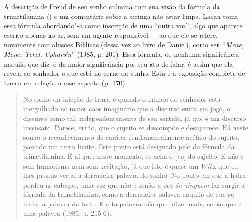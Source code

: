 A descrição de Freud de seu sonho culmina com sua visão da fórmula da
trimetilamina () e um comentário sobre a seringa não estar
limpa. Lacan toma essa fórmula abordando"-a como inscrição de uma ``outra
voz'', algo que aparece escrito apenas no ar, sem um agente responsável
--- ao que ele se refere, novamente com alusões Bíblicas (dessa vez ao
livro de Daniel), como seu ``\emph{Mene, Mene, Tekel, Upharsin}'' (1985, p.
201). Essa fórmula, de nenhuma significância naquilo que diz, é da maior
significância por seu ato de falar; é assim que ela revela ao sonhador o
que está no cerne do sonho. Esta é a exposição completa de Lacan em
relação a esse aspecto (p. 170):

\begin{quote}
No sonho da injeção de Irma, é quando o mundo do sonhador está
mergulhado no maior caos imaginário que o discurso entra em jogo, o
discurso como tal, independentemente de seu sentido, já que é um
discurso insensato. Parece, então, que o sujeito se descompõe e
desaparece. Há neste sonho o reconhecimento do caráter fundamentalmente
acéfalo do sujeito, passado um certo limite. Este ponto está designado
pelo \emph{} da fórmula da trimetilamina. É aí que, neste momento, se
acha o {[}\emph{eu}{]} do sujeito. E não e sem humorismo nem sem
hesitação, já que isto é quase um \emph{Witz}, que eu lhes propus ver aí
a derradeira palavra do sonho. No ponto em que a hidra perdeu as
cabeças, uma voz que não é senão \emph{a voz de} \emph{ninguém} faz
surgir a fórmula da trimetilamina, como a derradeira palavra daquilo de
que se trata, a palavra de tudo. E esta palavra não quer dizer nada,
senão que é uma palavra (1985, p. 215-6).
\end{quote}

